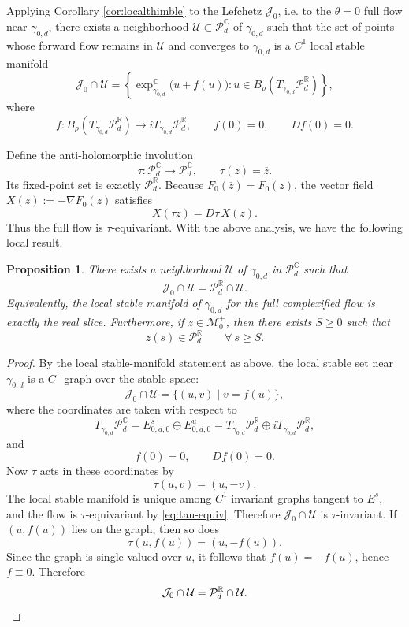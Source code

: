 \documentclass[11pt]{amsart}
\theoremstyle{plain}
\newtheorem{prop}[thm]{Proposition}
\theoremstyle{definition}
\newcommand{\R}{\mathbb{R}}
\newcommand{\C}{\mathbb{C}}
\newcommand{\PP}{\mathcal{P}}
\newcommand{\PR}{\mathcal{P}_d^{\mathbb{R}}}
\begin{document}
Applying Corollary \ref{cor:localthimble} to the Lefchetz $\mathcal{J}_0$, i.e. to the $\theta=0$ full flow near $\gamma_{0,d}$, there exists a neighborhood
$\mathcal{U}\subset \PP^{\C}_d$ of $\gamma_{0,d}$ such that the set of points whose forward
flow remains in $\mathcal{U}$ and converges to $\gamma_{0,d}$ is a $C^1$ local stable
manifold
\[
\mathcal{J}_0\cap \mathcal{U}=
\left\{
\exp_{\gamma_{0,d}}^{\C}\bigl(u+f(u)\bigr):u\in B_\rho(T_{\gamma_{0,d}}\PP_d^{\R})\right\},
\]
where
\[
f:B_\rho(T_{\gamma_{0,d}}\PP_d^{\R})\longrightarrow iT_{\gamma_{0,d}}\PP_d^{\R},
\qquad
f(0)=0,\qquad Df(0)=0.
\]



\medskip
Define the anti-holomorphic involution
\[
\tau:\PP_d^{\C}\to\PP_d^{\C},
\qquad
\tau(z)=\overline z.
\]
Its fixed-point set is exactly $\PR$.
Because $F_0(\overline z)=F_0(z)$, the vector field $X(z):=-\nabla F_0(z)$ satisfies
\begin{equation}\label{eq:tau-equiv}
X(\tau z)=D\tau\,X(z).
\end{equation}
Thus the full flow is $\tau$-equivariant. With the above analysis, we have the following local result.

\begin{prop}\label{prop:equivariant-local-stable}
There exists a neighborhood $\mathcal U$ of $\gamma_{0,d}$ in $\PP_{d}^{\C}$ such that
\[
\mathcal{J}_0\cap\mathcal U=\PR\cap\mathcal U.
\]
Equivalently, the local stable manifold of $\gamma_{0,d}$ for the full complexified flow is exactly the real slice. Furthermore, if $z\in\mathcal{M}_0^+$, then there exists $S\ge 0$ such that
\[
z(s)\in\PR\qquad\forall~ s\ge S.
\]
\end{prop}

\begin{proof}
By the local stable-manifold statement as above, the local
stable set near $\gamma_{0,d}$ is a $C^1$ graph over the stable space:
\[\mathcal{J}_0\cap\mathcal{U}
=\{(u,v)\mid v=f(u)\},
\]
where the coordinates are taken with respect to
\[
T_{\gamma_{0,d}}\PP^{\C}_d
=E^s_{0,d,0}\oplus E^u_{0,d,0}
=T_{\gamma_{0,d}}\PP^{\R}_d\oplus iT_{\gamma_{0,d}}\PP^{\R}_d,
\]
and
\[
f(0)=0,\qquad Df(0)=0.
\]
Now $\tau$ acts in these coordinates by
\[
\tau(u,v)=(u,-v).
\]
The local stable manifold is unique among $C^1$ invariant graphs tangent to $E^s$, and the flow is $\tau$-equivariant by \eqref{eq:tau-equiv}. Therefore $\mathcal{J}_0\cap\mathcal{U}$ is $\tau$-invariant. If $(u,f(u))$ lies on the graph, then so does
\[
\tau(u,f(u))=(u,-f(u)).
\]
Since the graph is single-valued over $u$, it follows that $f(u)=-f(u)$, hence $f\equiv 0$.
Therefore
\[
\mathcal{J}_0\cap\mathcal{U}=\PR\cap\mathcal U. \qedhere
\]
\end{proof}
\end{document}
